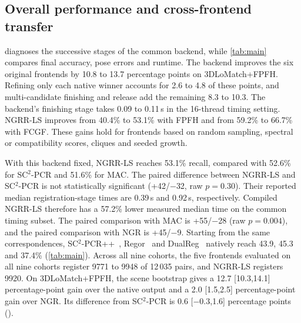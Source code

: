 \subsection{Overall performance and cross-frontend \texorpdfstring{\mbox{transfer}}{transfer}}
\label{sec:product}


\begin{table}[t]
\caption{Stage diagnosis on 1781 LoMatch+FPFH pairs. Gains (pp) compare winner ICP with native output, finishing with winner ICP, and release with finishing. $C$: correct refined-pose coverage; $E$: correct selection among covered pairs. Final accuracy and time are in \cref{tab:main}.}
\label{tab:joint}
\centering

\end{table}

 diagnoses the successive stages of the common backend, while \cref{tab:main} compares final accuracy, pose errors and runtime. The backend improves the six original frontends by 10.8 to 13.7 percentage points on 3DLoMatch+FPFH. Refining only each native winner accounts for 2.6 to 4.8 of these points, and multi-candidate finishing and release add the remaining 8.3 to 10.3. The backend's finishing stage takes 0.09 to 0.11\,s in the 16-thread timing setting. NGRR-LS improves from 40.4\% to 53.1\% with FPFH and from 59.2\% to 66.7\% with FCGF. These gains hold for frontends based on random sampling, spectral or compatibility scores, cliques and seeded growth.

With this backend fixed, NGRR-LS reaches 53.1\% recall, compared with 52.6\% for SC$^2$-PCR and 51.6\% for MAC. The paired difference between NGRR-LS and SC$^2$-PCR is not statistically significant (+42/$-$32, raw $p=0.30$). Their reported median registration-stage times are 0.39\,s and 0.92\,s, respectively. Compiled NGRR-LS therefore has a 57.2\% lower measured median time on the common timing subset. The paired comparison with MAC is +55/$-$28 (raw $p=0.004$), and the paired comparison with NGR is +45/$-$9. Starting from the same correspondences, SC$^2$-PCR++~\cite{chen2023sc2pp}, Regor~\cite{zhao2025regor} and DualReg~\cite{li2026dualreg} natively reach 43.9, 45.3 and 37.4\% (\cref{tab:main}). Across all nine cohorts, the five frontends evaluated on all nine cohorts register 9771 to 9948 of 12\,035 pairs, and NGRR-LS registers 9920. On 3DLoMatch+FPFH, the scene bootstrap gives a 12.7 [10.3,14.1] percentage-point gain over the native output and a 2.0 [1.5,2.5] percentage-point gain over NGR. Its difference from SC$^2$-PCR is 0.6 [$-0.3$,1.6] percentage points ().

